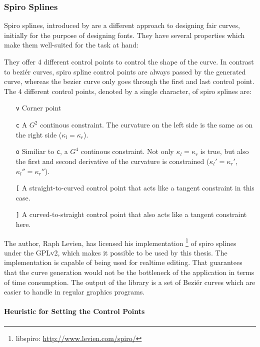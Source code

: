 \subsubsection{Spiro Splines}

Spiro splines, introduced by \cite{levien2009spiral} are a different approach to designing fair curves, initially for the purpose of designing fonts. They have several properties which make them well-suited for the task at hand:

They offer 4 different control points to control the shape of the curve. In contrast to beziér curves, spiro spline control points are always passed by the generated curve, whereas the bezier curve only goes through the first and last control point. The 4 different control points, denoted by a single character, of spiro splines are:

\begin{itemize}
\item[\texttt{v}] Corner point
\item[\texttt{c}] A $G^2$ continous constraint. The curvature  on the left side is the same as on the right side ($\kappa_l = \kappa_r$).
\item[\texttt{o}] Similiar to \texttt{c}, a $G^4$ continous constraint. Not only $\kappa_l = \kappa_r$ is true, but also the first and second derivative of the curvature is constrained ($\kappa_l' = \kappa_r'$, $\kappa_l'' = \kappa_r''$).
\item[\texttt{[}] A straight-to-curved control point that acts like a tangent constraint in this case.
\item[\texttt{]}] A curved-to-straight control point that also acts like a tangent constraint here.
\end{itemize}

The author, Raph Levien, has licensed his implementation \footnote{libspiro: \url{http://www.levien.com/spiro/} } of spiro splines under the GPLv2, which makes it possible to be used by this thesis. The implementation is capable of being used for realtime editing. That guarantees that the curve generation would not be the bottleneck of the application in terms of time consumption. The output of the library is a set of Beziér curves which are easier to handle in regular graphics programs.

\paragraph{Heuristic for Setting the Control Points}

